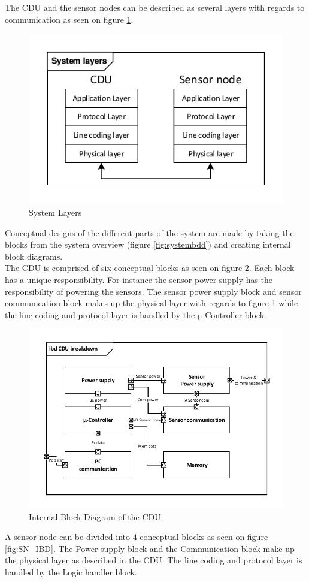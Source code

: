 The CDU and the sensor nodes can be described as several layers with regards to communication as seen on figure \ref{fig:systemlayers}.
\begin{figure}[H]
	\centering
	\includegraphics[width=.6\textwidth]{billeder/11ProjectDescription/System_Layers}
	\caption{System Layers}
	\label{fig:systemlayers}
\end{figure}
Conceptual designs of the different parts of the system are made by taking the blocks from the system overview (figure \ref{fig:systembdd}) and creating internal block diagrams.\\
The CDU is comprised of six conceptual blocks as seen on figure \ref{CDU_IBD}. Each block has a unique responsibility. For instance the sensor power supply has the responsibility of powering the sensors. The sensor power supply block and sensor communication block makes up the physical layer with regards to figure \ref{fig:systemlayers} while the line coding and protocol layer is handled by the µ-Controller block. 
\begin{figure}[hbpt]
	\centering
	\includegraphics[width=.8\textwidth]{billeder/11ProjectDescription/CDU_IBD}
	\caption{Internal Block Diagram of the CDU}
	\label{CDU_IBD}
\end{figure}
A sensor node can be divided into 4 conceptual blocks as seen on figure \ref{fig:SN_IBD}. The Power supply block and the Communication block make up the physical layer as described in the CDU. The line coding and protocol layer is handled by the Logic handler block.
